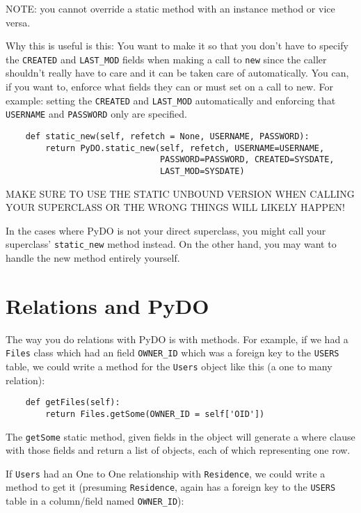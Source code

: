 \documentclass[titlepage]{manual}
\begin{document}
NOTE: you cannot override a static method with an instance method or
vice versa.

Why this is useful is this: You want to make it so that you don't have
to specify the \texttt{CREATED} and \texttt{LAST_MOD} fields when
making a call to \texttt{new} since the caller shouldn't really have
to care and it can be taken care of automatically.  You can, if you
want to, enforce what fields they can or must set on a call to new.
For example: setting the \texttt{CREATED} and \texttt{LAST_MOD}
automatically and enforcing that \texttt{USERNAME} and
\texttt{PASSWORD} only are specified.

\begin{verbatim}
    def static_new(self, refetch = None, USERNAME, PASSWORD):
        return PyDO.static_new(self, refetch, USERNAME=USERNAME, 
                               PASSWORD=PASSWORD, CREATED=SYSDATE, 
                               LAST_MOD=SYSDATE)
\end{verbatim}
       
MAKE SURE TO USE THE STATIC UNBOUND VERSION WHEN CALLING YOUR
SUPERCLASS OR THE WRONG THINGS WILL LIKELY HAPPEN!

In the cases where PyDO is not your direct superclass, you might call
your superclass' \texttt{static_new} method instead.  On the other
hand, you may want to handle the new method entirely yourself.


\section{Relations and PyDO}
The way you do relations with PyDO is with methods.  For example, if
we had a \texttt{Files} class which had an field \texttt{OWNER_ID}
which was a foreign key to the \texttt{USERS} table, we could write a
method for the \texttt{Users} object like this (a one to many
relation):
\begin{verbatim}
    def getFiles(self):
        return Files.getSome(OWNER_ID = self['OID'])
\end{verbatim}

The \texttt{getSome} static method, given fields in the object will
generate a where clause with those fields and return a list of
objects, each of which representing one row.

If \texttt{Users} had an One to One relationship with
\texttt{Residence}, we could write a method to get it (presuming
\texttt{Residence}, again has a foreign key to the \texttt{USERS}
table in a column/field named \texttt{OWNER_ID}):
\end{document}
